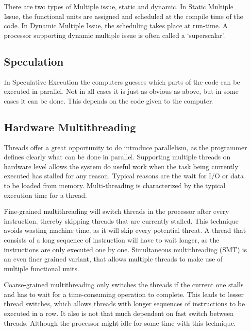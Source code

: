 \documentclass{article}
\begin{document}
	There are two types of Multiple issue, static and dynamic.
	In Static Multiple Issue, the functional units are assigned
	and scheduled at the compile time of the code.
	In Dynamic Multiple Issue, the scheduling takes place at run-time.
	A processor supporting dynamic multiple issue is often called a ‘superscalar’.

\subsection{Speculation} %
\label{sub:speculation}
	In Speculative Execution the computers guesses which parts of the code can be executed in parallel.
	Not in all cases it is just as obvious as above,
	but in some cases it can be done.
	This depends on the code given to the computer.

\subsection{Hardware Multithreading} %
\label{sub:hardware_multithreading}
	Threads offer a great opportunity to do introduce parallelism,
	as the programmer defines clearly what can be done in parallel.
	Supporting multiple threads on hardware level allows the system do useful work
	when the task being currently executed has stalled for any reason.
	Typical reasons are the wait for I/O or data to be loaded from memory.
	Multi-threading is characterized by the typical execution time for a thread.

	Fine-grained multithreading will switch threads in the processor after every instruction,
	thereby skipping threads that are currently stalled.
	This technique avoids wasting machine time,
	as it will skip every potential threat.
	A thread that consists of a long sequence of instruction will have to wait longer,
	as the instructions are only executed one by one.
	Simultaneous multithreading (SMT) is an even finer grained variant,
	that allows multiple threads to make use of multiple functional units.

	Coarse-grained multithreading only switches the threads if the current one stalls
	and has to wait for a time-consuming operation to complete.
	This leads to lesser thread switches,
	which allows threads with longer sequences of instructions to be executed in a row.
	It also is not that much dependent on fast switch between threads.
	Although the processor might idle for some time with this technique.
\end{document}
